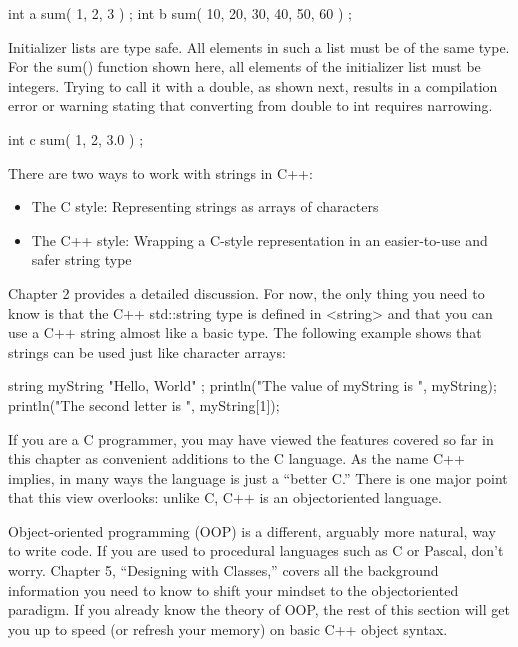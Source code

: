 \begin{cpp}
int a { sum({ 1, 2, 3 }) };
int b { sum({ 10, 20, 30, 40, 50, 60 }) };
\end{cpp}

Initializer lists are type safe. All elements in such a list must be of the same type. For the sum() function shown here, all elements of the initializer list must be integers. Trying to call it with a double, as shown next, results in a compilation error or warning stating that converting from double to int requires narrowing.

\begin{cpp}
int c { sum({ 1, 2, 3.0 }) };
\end{cpp}


There are two ways to work with strings in C++:

\begin{itemize}
\item
The C style: Representing strings as arrays of characters

\item
The C++ style: Wrapping a C-style representation in an easier-to-use and safer string type
\end{itemize}

Chapter 2 provides a detailed discussion. For now, the only thing you need to know is that the C++ std::string type is defined in <string> and that you can use a C++ string almost like a basic type. The following example shows that strings can be used just like character arrays:

\begin{cpp}
string myString { "Hello, World" };
println("The value of myString is {}", myString);
println("The second letter is {}", myString[1]);
\end{cpp}


If you are a C programmer, you may have viewed the features covered so far in this chapter as convenient additions to the C language. As the name C++ implies, in many ways the language is just a “better C.” There is one major point that this view overlooks: unlike C, C++ is an objectoriented language.

Object-oriented programming (OOP) is a different, arguably more natural, way to write code. If you are used to procedural languages such as C or Pascal, don’t worry. Chapter 5, “Designing with Classes,” covers all the background information you need to know to shift your mindset to the objectoriented paradigm. If you already know the theory of OOP, the rest of this section will get you up to speed (or refresh your memory) on basic C++ object syntax.

